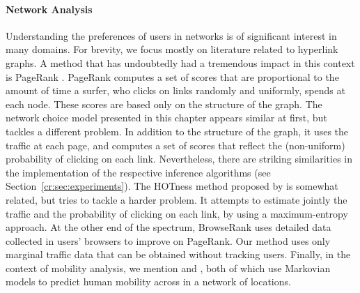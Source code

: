 \paragraph{Network Analysis}
Understanding the preferences of users in networks is of significant interest in many domains.
For brevity, we focus mostly on literature related to hyperlink graphs.
A method that has undoubtedly had a tremendous impact in this context is PageRank \citep{brin1998anatomy}.
PageRank computes a set of scores that are proportional to the amount of time a surfer, who clicks on links randomly and uniformly, spends at each node.
These scores are based only on the structure of the graph.
The network choice model presented in this chapter appears similar at first, but tackles a different problem.
In addition to the structure of the graph, it uses the traffic at each page, and computes a set of scores that reflect the (non-uniform) probability of clicking on each link.
Nevertheless, there are striking similarities in the implementation of the respective inference algorithms (see Section~\ref{cr:sec:experiments}).
The HOTness method proposed by \citet{tomlin2003new} is somewhat related, but tries to tackle a harder problem.
It attempts to estimate jointly the traffic and the probability of clicking on each link, by using a maximum-entropy approach.
At the other end of the spectrum, BrowseRank \citep{liu2008browserank} uses detailed data collected in users' browsers to improve on PageRank.
Our method uses only marginal traffic data that can be obtained without tracking users.
Finally, in the context of mobility analysis, we mention \citet{ashbrook2003using} and \citet{kafsi2015traveling}, both of which use Markovian models to predict human mobility across in a network of locations.
